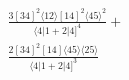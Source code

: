 \documentclass[varwidth, border=5pt]{standalone}
\begin{document}
\begin{my}
$\begin{gathered}
\scriptscriptstyle\frac{3[34]^2⟨12⟩[14]^2⟨45⟩^2}{⟨4|1+2|4]^4}+\\
\scriptscriptstyle\frac{2[34]^2[14]⟨45⟩⟨25⟩}{⟨4|1+2|4]^3}\phantom{+}
\end{gathered}$
\end{my}
\end{document}

